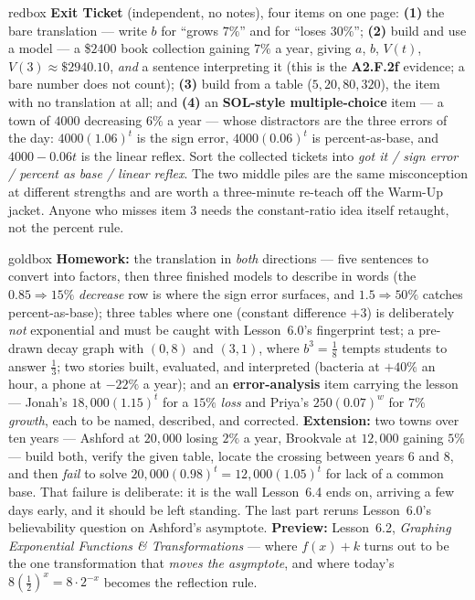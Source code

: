\documentclass[10pt]{article}
\begin{document}
\begin{skillbox}{redbox}
\textbf{Exit Ticket} (independent, no notes), four items on one page: \textbf{(1)} the bare
translation --- write $b$ for ``grows $7\%$'' and for ``loses $30\%$''; \textbf{(2)} build and use a
model --- a \$$2400$ book collection gaining $7\%$ a year, giving $a$, $b$, $V(t)$, $V(3)\approx
\$2940.10$, \emph{and} a sentence interpreting it (this is the \textbf{A2.F.2f} evidence; a bare
number does not count); \textbf{(3)} build from a table ($5,20,80,320$), the item with no translation
at all; and \textbf{(4)} an \textbf{SOL-style multiple-choice} item --- a town of $4000$ decreasing
$6\%$ a year --- whose distractors are the three errors of the day: $4000(1.06)^{t}$ is the sign
error, $4000(0.06)^{t}$ is percent-as-base, and $4000-0.06t$ is the linear reflex. Sort the collected
tickets into \emph{got it / sign error / percent as base / linear reflex}. The two middle piles are
the same misconception at different strengths and are worth a three-minute re-teach off the Warm-Up
jacket. Anyone who misses item 3 needs the constant-ratio idea itself retaught, not the percent rule.
\end{skillbox}

\begin{skillbox}{goldbox}
\textbf{Homework:} the translation in \emph{both} directions --- five sentences to convert into
factors, then three finished models to describe in words (the $0.85 \Rightarrow 15\%$
\emph{decrease} row is where the sign error surfaces, and $1.5 \Rightarrow 50\%$ catches
percent-as-base); three tables where one (constant difference $+3$) is deliberately \emph{not}
exponential and must be caught with Lesson~6.0's fingerprint test; a pre-drawn decay graph with
$(0,8)$ and $(3,1)$, where $b^{3}=\frac18$ tempts students to answer $\frac13$; two stories built,
evaluated, and interpreted (bacteria at $+40\%$ an hour, a phone at $-22\%$ a year); and an
\textbf{error-analysis} item carrying the lesson --- Jonah's $18{,}000(1.15)^{t}$ for a $15\%$
\emph{loss} and Priya's $250(0.07)^{w}$ for $7\%$ \emph{growth}, each to be named, described, and
corrected. \textbf{Extension:} two towns over ten years --- Ashford at $20{,}000$ losing $2\%$ a
year, Brookvale at $12{,}000$ gaining $5\%$ --- build both, verify the given table, locate the
crossing between years $6$ and $8$, and then \emph{fail} to solve
$20{,}000(0.98)^{t}=12{,}000(1.05)^{t}$ for lack of a common base. That failure is deliberate: it is
the wall Lesson~6.4 ends on, arriving a few days early, and it should be left standing. The last
part reruns Lesson~6.0's believability question on Ashford's asymptote. \textbf{Preview:}
Lesson~6.2, \emph{Graphing Exponential Functions \& Transformations} --- where $f(x)+k$ turns out to
be the one transformation that \emph{moves the asymptote}, and where today's
$8\left(\frac12\right)^{x}=8\cdot2^{-x}$ becomes the reflection rule.
\end{skillbox}
\end{document}
